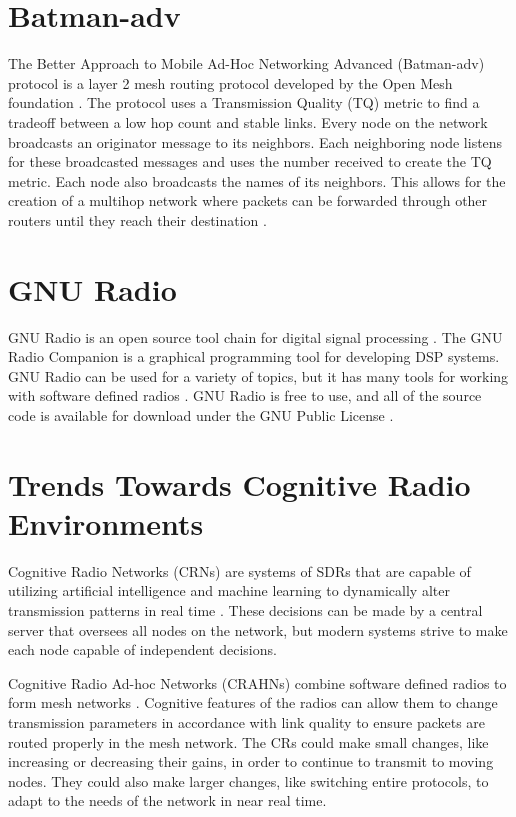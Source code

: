 \section{Batman-adv}

The Better Approach to Mobile Ad-Hoc Networking Advanced (Batman-adv) protocol is a layer 2 mesh routing protocol developed by the Open Mesh foundation \cite{0032}. The protocol uses a Transmission Quality (TQ) metric to find a tradeoff between a low hop count and stable links. Every node on the network broadcasts an originator message to its neighbors. Each neighboring node listens for these broadcasted messages and uses the number received to create the TQ metric. Each node also broadcasts the names of its neighbors. This allows for the creation of a multihop network where packets can be forwarded through other routers until they reach their destination \cite{6115569}. 

\section{GNU Radio}

GNU Radio is an open source tool chain for digital signal processing \cite{7043470} . The GNU Radio Companion is a graphical programming tool for developing DSP systems. GNU Radio can be used for a variety of topics, but it has many tools for working with software defined radios \cite{7430125}. GNU Radio is free to use, and all of the source code is available for download under the GNU Public License \cite{6081528}. 
 

\section{Trends Towards Cognitive Radio Environments}

Cognitive Radio Networks (CRNs) are systems of SDRs that are capable of utilizing artificial intelligence and machine learning to dynamically alter transmission patterns in real time \cite{Akyildiz2007921}. These decisions can be made by a central server that oversees all nodes on the network, but modern systems strive to make each node capable of independent decisions. 

Cognitive Radio Ad-hoc Networks (CRAHNs) combine software defined radios to form mesh networks \cite{Akyildiz2009810}. Cognitive features of the radios can allow them to change transmission parameters in accordance with link quality to ensure packets are routed properly in the mesh network. The CRs could make small changes, like increasing or decreasing their gains, in order to continue to transmit to moving nodes. They could also make larger changes, like switching entire protocols, to adapt to the needs of the network in near real time. 

